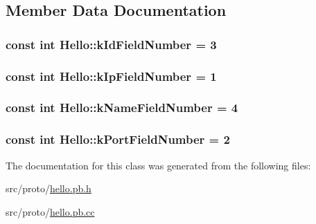 \subsection{Member Data Documentation}
\subsubsection[{\texorpdfstring{k\+Id\+Field\+Number}{kIdFieldNumber}}]{\setlength{\rightskip}{0pt plus 5cm}const int Hello\+::k\+Id\+Field\+Number = 3\hspace{0.3cm}{\ttfamily [static]}}\hypertarget{class_hello_a0037e73934ee5284e2cdc7ed3ee08240}{}\label{class_hello_a0037e73934ee5284e2cdc7ed3ee08240}
\subsubsection[{\texorpdfstring{k\+Ip\+Field\+Number}{kIpFieldNumber}}]{\setlength{\rightskip}{0pt plus 5cm}const int Hello\+::k\+Ip\+Field\+Number = 1\hspace{0.3cm}{\ttfamily [static]}}\hypertarget{class_hello_aaab2e3961762dda3d0bba74ef3024054}{}\label{class_hello_aaab2e3961762dda3d0bba74ef3024054}
\subsubsection[{\texorpdfstring{k\+Name\+Field\+Number}{kNameFieldNumber}}]{\setlength{\rightskip}{0pt plus 5cm}const int Hello\+::k\+Name\+Field\+Number = 4\hspace{0.3cm}{\ttfamily [static]}}\hypertarget{class_hello_ac858de891973af41de85d53ad9fc02a7}{}\label{class_hello_ac858de891973af41de85d53ad9fc02a7}
\subsubsection[{\texorpdfstring{k\+Port\+Field\+Number}{kPortFieldNumber}}]{\setlength{\rightskip}{0pt plus 5cm}const int Hello\+::k\+Port\+Field\+Number = 2\hspace{0.3cm}{\ttfamily [static]}}\hypertarget{class_hello_a3a791c34e509d6daa9c887afb1311a6d}{}\label{class_hello_a3a791c34e509d6daa9c887afb1311a6d}


The documentation for this class was generated from the following files\+:\begin{DoxyCompactItemize}
\item 
src/proto/\hyperlink{hello_8pb_8h}{hello.\+pb.\+h}\item 
src/proto/\hyperlink{hello_8pb_8cc}{hello.\+pb.\+cc}\end{DoxyCompactItemize}
